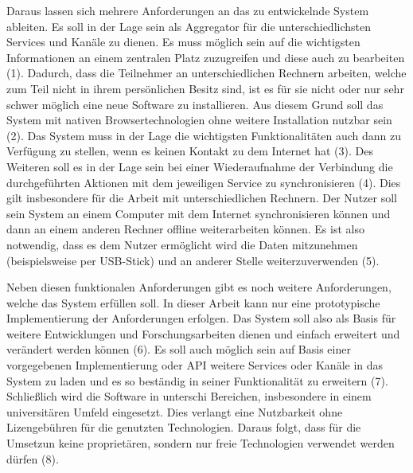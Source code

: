 Daraus lassen sich mehrere Anforderungen an das zu entwickelnde System ableiten. Es soll in der Lage sein als Aggregator für die unterschiedlichsten Services und Kanäle zu dienen. Es muss möglich sein auf die wichtigsten Informationen an einem zentralen Platz zuzugreifen und diese auch zu bearbeiten (1). Dadurch, dass die Teilnehmer an unterschiedlichen Rechnern arbeiten, welche zum Teil nicht in ihrem persönlichen Besitz sind, ist es für sie nicht oder nur sehr schwer möglich eine neue Software zu installieren. Aus diesem Grund soll das System mit nativen Browsertechnologien ohne weitere Installation nutzbar sein (2). Das System muss in der Lage die wichtigsten Funktionalitäten auch dann zu Verfügung zu stellen, wenn es keinen Kontakt zu dem Internet hat (3). Des Weiteren soll es in der Lage sein bei einer Wiederaufnahme der Verbindung die durchgeführten Aktionen mit dem jeweiligen Service zu synchronisieren (4). Dies gilt insbesondere für die Arbeit mit unterschiedlichen Rechnern. Der Nutzer soll sein System an einem Computer mit dem Internet synchronisieren können und dann an einem anderen Rechner offline weiterarbeiten können. Es ist also notwendig, dass es dem Nutzer ermöglicht wird die Daten mitzunehmen (beispielsweise per USB-Stick) und an anderer Stelle weiterzuverwenden (5). 

Neben diesen funktionalen Anforderungen gibt es noch weitere Anforderungen, welche das System erfüllen soll. In dieser Arbeit kann nur eine prototypische Implementierung der Anforderungen erfolgen. Das System soll also als Basis für weitere Entwicklungen und Forschungsarbeiten dienen und einfach erweitert und verändert werden können (6). Es soll auch möglich sein auf Basis einer vorgegebenen Implementierung oder API weitere Services oder Kanäle in das System zu laden und es so beständig in seiner Funktionalität zu erweitern (7). Schließlich wird die Software in unterschi Bereichen, insbesondere in einem universitären Umfeld eingesetzt. Dies verlangt eine Nutzbarkeit ohne Lizengebühren für die genutzten Technologien. Daraus folgt, dass für die Umsetzun keine proprietären, sondern nur freie Technologien verwendet werden dürfen (8). 


